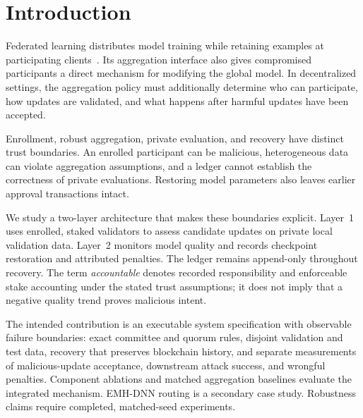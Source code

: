 \section{Introduction}
Federated learning distributes model training while retaining examples at
participating clients~\cite{mcmahan2017}. Its aggregation interface also gives
compromised participants a direct mechanism for modifying the global model.
In decentralized settings, the aggregation policy must additionally determine
who can participate, how updates are validated, and what happens after harmful
updates have been accepted.

Enrollment, robust aggregation, private evaluation, and recovery have distinct
trust boundaries. An enrolled participant can be malicious, heterogeneous data
can violate aggregation assumptions, and a ledger cannot establish the correctness
of private evaluations. Restoring model parameters also leaves earlier approval
transactions intact.

We study a two-layer architecture that makes these boundaries explicit. Layer~1
uses enrolled, staked validators to assess candidate updates on private local
validation data. Layer~2 monitors model quality and records checkpoint restoration
and attributed penalties. The ledger remains append-only throughout recovery.
The term \emph{accountable} denotes recorded responsibility and enforceable stake
accounting under the stated trust assumptions; it does not imply that a negative
quality trend proves malicious intent.

The intended contribution is an executable system specification with observable
failure boundaries: exact committee and quorum rules, disjoint validation and
test data, recovery that preserves blockchain history, and separate measurements
of malicious-update acceptance, downstream attack success, and wrongful penalties.
Component ablations and matched aggregation baselines evaluate the integrated
mechanism. EMH-DNN routing is a secondary case study. Robustness claims require
completed, matched-seed experiments.
